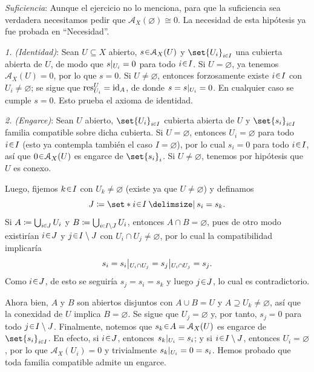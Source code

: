 \begin{sol}
\medskip
\noindent\emph{Suficiencia}: Aunque el ejercicio no lo menciona, para que la suficiencia sea verdadera necesitamos pedir que $\mathcal A_X(\varnothing)\cong0$. La necesidad de esta hipótesis ya fue probada en ``Necesidad''.

\medskip
\noindent\emph{1. (Identidad)}: Sean $U\subseteq X$ abierto, $s\en\mathcal A_X(U)$ y $\set{U_i}_{i\en I}$ una cubierta abierta de $U$, de modo que $\restr{s}{U_i}=0$ para todo $i\en I$. Si $U=\varnothing$, ya tenemos $\mathcal A_X(U)=0$, por lo que $s=0$. Si $U\ne\varnothing$, entonces forzosamente existe $i\en I$ con $U_i\ne\varnothing$; se sigue que $\operatorname{res}_{U_i}^U=\operatorname{id}_A$, de donde $s=\restr{s}{U_i}=0$. En cualquier caso se cumple $s=0$. Esto prueba el axioma de identidad.

\medskip
\noindent\emph{2. (Engarce)}: Sean $U$ abierto, $\set{U_i}_{i\en I}$ cubierta abierta de $U$ y $\set{s_i}_{i\en I}$ familia compatible sobre dicha cubierta. Si $U=\varnothing$, entonces $U_i=\varnothing$ para todo $i\en I$ (esto ya contempla también el caso $I=\varnothing$), por lo cual $s_i=0$ para todo $i\en I$, así que $0\en\mathcal A_X(U)$ es engarce de $\set{s_i}_i$. Si $U\ne\varnothing$, tenemos por hipótesis que $U$ es conexo.

Luego, fijemos $k\en I$ con $U_k\ne\varnothing$ (existe ya que $U\ne\varnothing$) y definamos
\[
J\coloneq\set*{i\en I\given s_i=s_k}.
\]
Si $A\coloneq\bigcup_{i\en J}U_i$ y $B\coloneq\bigcup_{i\en I\setminus J}U_i$, entonces $A\cap B=\varnothing$, pues de otro modo existirían $i\en J$ y $j\en I\setminus J$ con $U_i\cap U_j\ne\varnothing$, por lo cual la compatibilidad implicaría
\[
s_i=\restr{s_i}{U_i\cap U_j}=\restr{s_j}{U_i\cap U_j}=s_j.
\]
Como $i\en J$, de esto se seguiría $s_j=s_i=s_k$ y luego $j\en J$, lo cual es contradictorio.

Ahora bien, $A$ y $B$ son abiertos disjuntos con $A\cup B=U$ y $A\supseteq U_k\ne\varnothing$, así que la conexidad de $U$ implica $B=\varnothing$. Se sigue que $U_j=\varnothing$ y, por tanto, $s_j=0$ para todo $j\en I\setminus J$. Finalmente, notemos que $s_k\en A=\mathcal A_X(U)$ es engarce de $\set{s_i}_{i\en I}$. En efecto, si $i\en J$, entonces $\restr{s_k}{U_i}=s_i$; y si $i\en I\setminus J$, entonces $U_i=\varnothing$, por lo que $\mathcal A_X(U_i)=0$ y trivialmente $\restr{s_k}{U_i}=0=s_i$. Hemos probado que toda familia compatible admite un engarce.
\end{sol}
